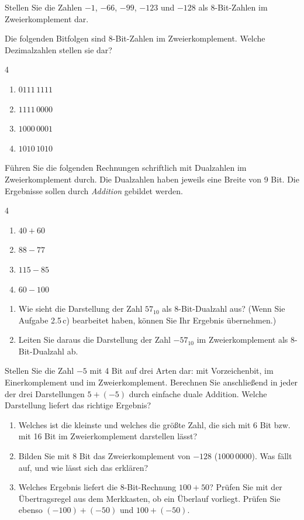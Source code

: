 Stellen Sie die Zahlen $-1$, $-66$, $-99$, $-123$ und $-128$ als 8-Bit-Zahlen im Zweierkomplement dar.

Die folgenden Bitfolgen sind 8-Bit-Zahlen im Zweierkomplement. Welche Dezimalzahlen stellen sie dar?
\begin{multicols}{4}
\begin{enumerate}[label=\alph*)]
\item $0111\,1111$
\item $1111\,0000$
\item $1000\,0001$
\item $1010\,1010$
\end{enumerate}
\end{multicols}

Führen Sie die folgenden Rechnungen schriftlich mit Dualzahlen im Zweierkomplement durch. Die Dualzahlen haben jeweils eine Breite von 9 Bit. Die Ergebnisse sollen durch \emph{Addition} gebildet werden.
\begin{multicols}{4}
\begin{enumerate}[label=\alph*)]
\item $40 + 60$
\item $88 - 77$
\item $115 - 85$
\item $60 - 100$
\end{enumerate}
\end{multicols}

\begin{enumerate}[label=\alph*)]
\item Wie sieht die Darstellung der Zahl $57_{10}$ als 8-Bit-Dualzahl aus? (Wenn Sie Aufgabe 2.5\,c) bearbeitet haben, können Sie Ihr Ergebnis übernehmen.)
\item Leiten Sie daraus die Darstellung der Zahl $-57_{10}$ im Zweierkomplement als 8-Bit-Dualzahl ab.
\end{enumerate}

Stellen Sie die Zahl $-5$ mit 4 Bit auf drei Arten dar: mit Vorzeichenbit, im Einerkomplement und im Zweierkomplement. Berechnen Sie anschließend in jeder der drei Darstellungen $5 + (-5)$ durch einfache duale Addition. Welche Darstellung liefert das richtige Ergebnis?

\begin{enumerate}[label=\alph*)]
\item Welches ist die kleinste und welches die größte Zahl, die sich mit 6 Bit bzw. mit 16 Bit im Zweierkomplement darstellen lässt?
\item Bilden Sie mit 8 Bit das Zweierkomplement von $-128$ ($1000\,0000$). Was fällt auf, und wie lässt sich das erklären?
\item Welches Ergebnis liefert die 8-Bit-Rechnung $100 + 50$? Prüfen Sie mit der Übertragsregel aus dem Merkkasten, ob ein Überlauf vorliegt. Prüfen Sie ebenso $(-100) + (-50)$ und $100 + (-50)$.
\end{enumerate}


